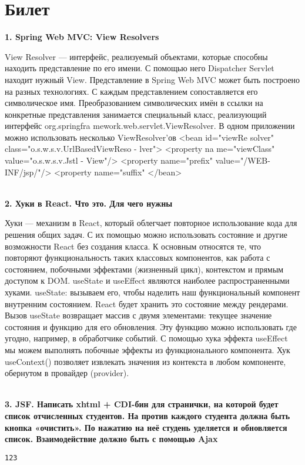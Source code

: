 \documentclass{article}
\newcommand{\bil}[5]{%
        \section{Билет}
        \textbf{1. #1}

        #4
        \\
        \textbf{2. #2}
        
        #5
        \\
        \textbf{3. #3}
}
\begin{document}
\bil{Spring Web MVC: View Resolvers}
{Хуки в React. Что это. Для чего нужны}
{JSF. Написать xhtml + CDI-бин для странички, на которой будет список отчисленных студентов. На против каждого студента должна быть кнопка «очистить». По нажатию на неё студень уделяется и обновляется список. Взаимодействие должно быть с помощью Ajax}{
    View Resolver — интерфейс, реализуемый объектами, которые способны находить представление по его имени. 
    С помощью него Dispatcher Servlet находит нужный View.
    Представление в Spring Web MVC может быть построено на разных технологиях.
    С каждым представлением сопоставляется его символическое имя.
    Преобразованием символических имён в ссылки на конкретные представления занимается специальный класс, реализующий интерфейс org.springfra mework.web.servlet.ViewResolver.
    В одном приложении можно использовать несколько ViewResolver'ов
    <bean id="viewRe solver" class="o.s.w.s.v.UrlBasedViewReso - lver"> <property na me="viewClass"
              value="o.s.w.s.v.Jstl - View"/>
    <property name="prefix"
              value="/WEB-INF/jsp/"/>
    <property name="suffix"
</bean>
}{
    Хуки — механизм в React, который облегчает повторное использование кода для решения общих задач. 
    С их помощью можно использовать состояние и другие возможности React без создания класса.
    К основным относятся те, что повторяют функциональность таких классовых компонентов, как работа с состоянием, побочными эффектами (жизненный цикл), контекстом и прямым доступом к DOM.
    useState и useEffect являются наиболее распространенными хуками.
    useState: вызываем его, чтобы наделить наш функциональный компонент внутренним состоянием. React будет хранить это состояние между рендерами. 
    Вызов useState возвращает массив с двумя элементами: текущее значение состояния и функцию для его обновления. 
    Эту функцию можно использовать где угодно, например, в обработчике событий. 
    С помощью хука эффекта useEffect мы можем выполнять побочные эффекты из функционального компонента.
    Хук useContext() позволяет извлекать значения из контекста в любом компоненте, обернутом в провайдер (provider).
}
\begin{lstlisting}[frame=single, basicstyle=\ttfamily, breaklines=true, breakatwhitespace=true, postbreak=\mbox{\textcolor{red}{$\hookrightarrow$}\space}]
123
\end{lstlisting}
\end{document}
